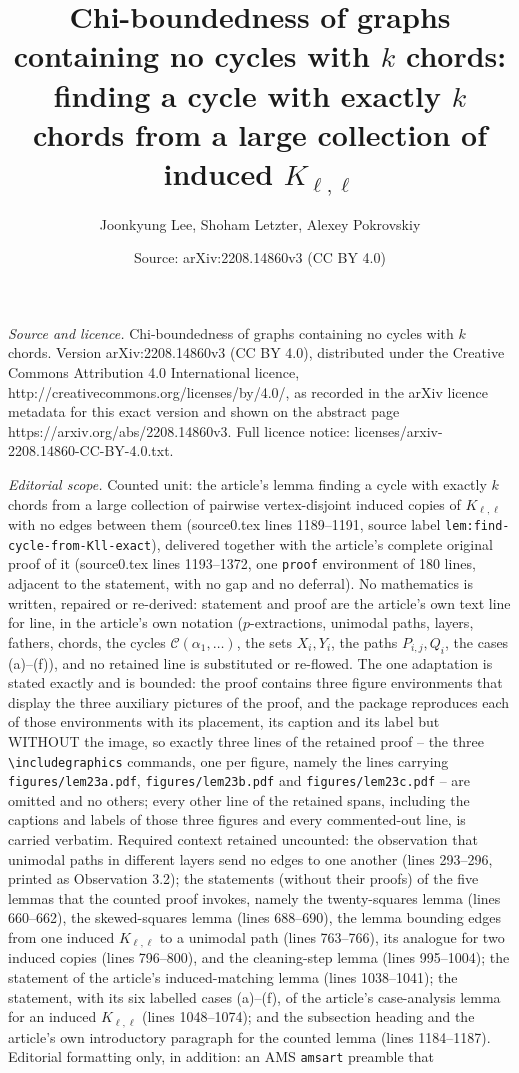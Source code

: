 \documentclass[10pt,a4paper]{amsart}
\title[Finding a cycle with exactly $k$ chords]{Chi-boundedness of graphs containing no cycles with $k$ chords: finding a cycle with exactly $k$ chords from a large collection of induced $K_{\ell,\ell}$}
\author{Joonkyung Lee, Shoham Letzter, Alexey Pokrovskiy}
\date{Source: arXiv:2208.14860v3 (CC BY 4.0)}
\theoremstyle{plain}
\theoremstyle{definition}
\newcommand{\C}{\mathcal{C}}
\begin{document}
\maketitle

\noindent\emph{Source and licence.} Chi-boundedness of graphs containing no cycles with $k$ chords. Version arXiv:2208.14860v3 (CC BY 4.0), distributed under the Creative Commons Attribution 4.0 International licence, http://creativecommons.org/licenses/by/4.0/, as recorded in the arXiv licence metadata for this exact version and shown on the abstract page https://arxiv.org/abs/2208.14860v3. Full licence notice: licenses/arxiv-2208.14860-CC-BY-4.0.txt.\par\smallskip

\noindent\textit{Editorial scope.} Counted unit: the article's lemma finding a cycle with exactly $k$ chords from a large collection of pairwise vertex-disjoint induced copies of $K_{\ell,\ell}$ with no edges between them (source0.tex lines 1189--1191, source label \texttt{lem:find-cycle-from-Kll-exact}), delivered together with the article's complete original proof of it (source0.tex lines 1193--1372, one \texttt{proof} environment of 180 lines, adjacent to the statement, with no gap and no deferral). No mathematics is written, repaired or re-derived: statement and proof are the article's own text line for line, in the article's own notation ($p$-extractions, unimodal paths, layers, fathers, chords, the cycles $\C(\alpha_1,\ldots)$, the sets $X_i,Y_i$, the paths $P_{i,j},Q_i$, the cases (a)--(f)), and no retained line is substituted or re-flowed. The one adaptation is stated exactly and is bounded: the proof contains three figure environments that display the three auxiliary pictures of the proof, and the package reproduces each of those environments with its placement, its caption and its label but WITHOUT the image, so exactly three lines of the retained proof -- the three \texttt{\textbackslash includegraphics} commands, one per figure, namely the lines carrying \texttt{figures/lem23a.pdf}, \texttt{figures/lem23b.pdf} and \texttt{figures/lem23c.pdf} -- are omitted and no others; every other line of the retained spans, including the captions and labels of those three figures and every commented-out line, is carried verbatim. Required context retained uncounted: the observation that unimodal paths in different layers send no edges to one another (lines 293--296, printed as Observation 3.2); the statements (without their proofs) of the five lemmas that the counted proof invokes, namely the twenty-squares lemma (lines 660--662), the skewed-squares lemma (lines 688--690), the lemma bounding edges from one induced $K_{\ell,\ell}$ to a unimodal path (lines 763--766), its analogue for two induced copies (lines 796--800), and the cleaning-step lemma (lines 995--1004); the statement of the article's induced-matching lemma (lines 1038--1041); the statement, with its six labelled cases (a)--(f), of the article's case-analysis lemma for an induced $K_{\ell,\ell}$ (lines 1048--1074); and the subsection heading and the article's own introductory paragraph for the counted lemma (lines 1184--1187). Editorial formatting only, in addition: an AMS \texttt{amsart} preamble that 
\end{document}
